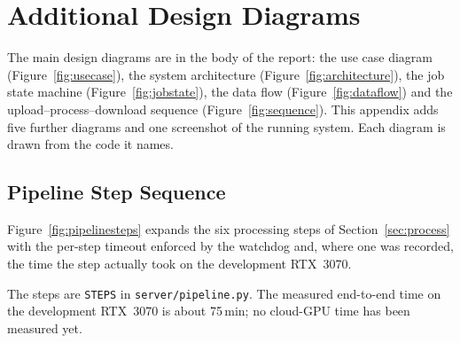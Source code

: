 \chapter{Additional Design Diagrams}

The main design diagrams are in the body of the report: the use case diagram (Figure~\ref{fig:usecase}), the system architecture (Figure~\ref{fig:architecture}), the job state machine (Figure~\ref{fig:jobstate}), the data flow (Figure~\ref{fig:dataflow}) and the upload--process--download sequence (Figure~\ref{fig:sequence}). This appendix adds five further diagrams and one screenshot of the running system. Each diagram is drawn from the code it names.

\section{Pipeline Step Sequence}
Figure~\ref{fig:pipelinesteps} expands the six processing steps of Section~\ref{sec:process} with the per-step timeout enforced by the watchdog and, where one was recorded, the time the step actually took on the development RTX~3070.


The steps are \texttt{STEPS} in \texttt{server/pipeline.py}. The measured end-to-end time on the development RTX~3070 is about 75\,min; no cloud-GPU time has been measured yet.

